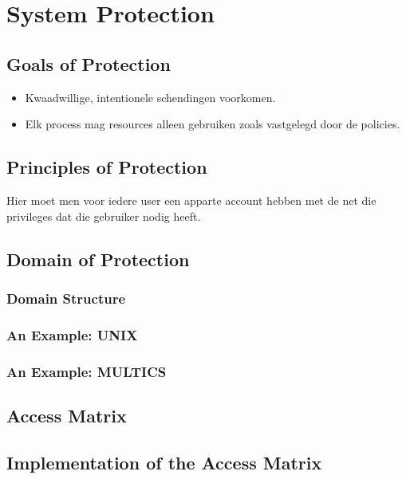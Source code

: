 \section{System Protection}
\subsection{Goals of Protection}
\begin{itemize}
	\item Kwaadwillige, intentionele schendingen voorkomen.
	\item Elk process mag resources alleen gebruiken zoals vastgelegd door de policies.
\end{itemize}

\subsection{Principles of Protection}
Hier moet men voor iedere user een apparte account hebben met de net die privileges dat die gebruiker nodig heeft.

\subsection{Domain of Protection}
\subsubsection{Domain Structure}
\subsubsection{An Example: UNIX}
\subsubsection{An Example: MULTICS}

\subsection{Access Matrix}

\subsection{Implementation of the Access Matrix}
